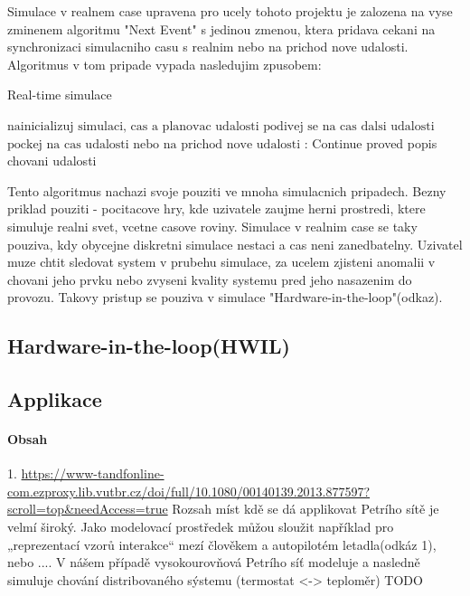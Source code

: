 Simulace v realnem case upravena pro ucely tohoto projektu je zalozena na vyse zminenem algoritmu "Next Event" s jedinou zmenou, ktera pridava cekani na synchronizaci simulacniho casu s realnim nebo na prichod nove udalosti. Algoritmus v tom pripade vypada nasledujim zpusobem:

\begin{algorithm}
\caption{Real-time simulace}\label{euclid}
\begin{algorithmic}[1]
\State $\text{nainicializuj simulaci, cas a planovac udalosti}$
\State $\text{podivej se na cas dalsi udalosti}$
\Return
\EndIf
\State $\text{pockej na cas udalosti nebo na prichod nove udalosti}$
:
    \State Continue
\EndIf
\State proved popis chovani udalosti
\EndWhile
\end{algorithmic}
\end{algorithm}

Tento algoritmus nachazi svoje pouziti ve mnoha simulacnich pripadech. Bezny priklad pouziti - pocitacove hry, kde uzivatele zaujme herni prostredi, ktere simuluje realni svet, vcetne casove roviny. Simulace v realnim case se taky pouziva, kdy obycejne diskretni simulace nestaci a cas neni zanedbatelny. Uzivatel muze chtit sledovat system v prubehu simulace, za ucelem zjisteni anomalii v chovani jeho prvku nebo zvyseni kvality systemu pred jeho nasazenim do provozu. Takovy pristup se pouziva v simulace "Hardware-in-the-loop"(odkaz).
\subsection{Hardware-in-the-loop(HWIL)}
\subsection{Applikace}
\paragraph{Obsah}

1. \url{https://www-tandfonline-com.ezproxy.lib.vutbr.cz/doi/full/10.1080/00140139.2013.877597?scroll=top&needAccess=true}
Rozsah míst kdě se dá applikovat Petrího sítě je velmí široký. Jako modelovací prostředek můžou sloužit například pro „reprezentací vzorů interakce“ mezí člověkem a autopilotém letadla(odkáz 1), nebo .... V nášem případě vysokourovňová Petrího síť modeluje a nasledně simuluje chování distribovaného sýstemu (termostat <-> teploměr) TODO

